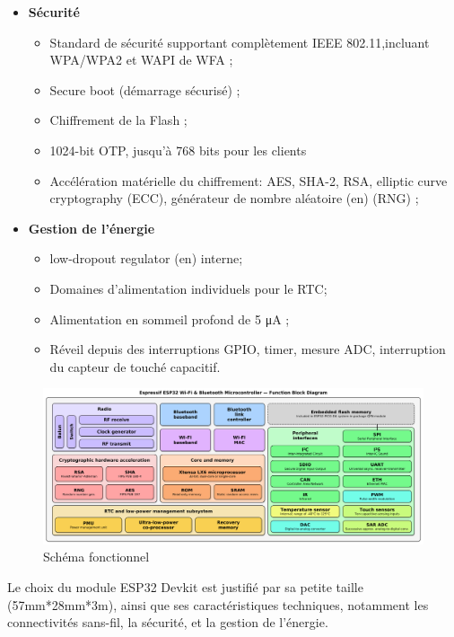 \begin{itemize}
    \item[\textbullet]\textbf{Sécurité}   
        \begin{itemize}
            \item Standard de sécurité supportant complètement IEEE
                802.11,incluant WPA/WPA2 et WAPI de WFA ;
            \item Secure boot (démarrage sécurisé) ;
            \item Chiffrement de la Flash ;
            \item 1024-bit OTP, jusqu'à 768 bits pour les clients
            \item Accélération matérielle du chiffrement: AES, SHA-2, RSA,
                elliptic curve cryptography (ECC), générateur de nombre
                aléatoire (en) (RNG) ;
        \end{itemize}
    \item[\textbullet]\textbf{Gestion de l'énergie}

        \begin{itemize}
            \item low-dropout regulator (en) interne;
            \item Domaines d'alimentation individuels pour le RTC;
            \item Alimentation en sommeil profond de 5 μA ;
            \item Réveil depuis des interruptions GPIO, timer, mesure ADC,
                interruption du capteur de touché capacitif.
        \end{itemize}
\end{itemize}


\begin{figure}[h!]
    \centering
    \includegraphics[scale=0.26 ]{images/esp32_fun.png}
    \caption{Schéma fonctionnel}
    \label{fig50}
\end{figure}

Le choix du module ESP32 Devkit est justifié par sa petite taille 
(57mm*28mm*3m), ainsi que ses caractéristiques techniques, notamment les
connectivités sans-fil, la sécurité, et la gestion de l’énergie.

